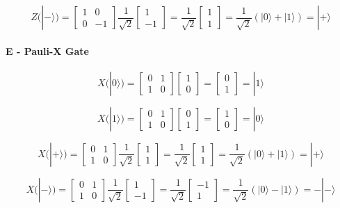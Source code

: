 \documentclass[12pt]{article}
\begin{document}
$$ Z(|-⟩) = \begin{bmatrix} 1 & 0 \\ 0 & -1 \end{bmatrix} \frac{1}{\sqrt{2}} \begin{bmatrix} 1 \\ -1 \end{bmatrix} = \frac{1}{\sqrt{2}} \begin{bmatrix} 1 \\ 1 \end{bmatrix} = \frac{1}{\sqrt{2}} (|0⟩ + |1⟩) = |+⟩ $$

\paragraph*{E - Pauli-X Gate}

$$ X(|0⟩) = \begin{bmatrix} 0 & 1 \\ 1 & 0 \end{bmatrix} \begin{bmatrix} 1 \\ 0 \end{bmatrix} = \begin{bmatrix} 0 \\ 1 \end{bmatrix} = |1⟩ $$

$$ X(|1⟩) = \begin{bmatrix} 0 & 1 \\ 1 & 0 \end{bmatrix} \begin{bmatrix} 0 \\ 1 \end{bmatrix} = \begin{bmatrix} 1 \\ 0 \end{bmatrix} = |0⟩ $$

$$ X(|+⟩) = \begin{bmatrix} 0 & 1 \\ 1 & 0 \end{bmatrix} \frac{1}{\sqrt{2}} \begin{bmatrix} 1 \\ 1 \end{bmatrix} = \frac{1}{\sqrt{2}} \begin{bmatrix} 1 \\ 1 \end{bmatrix} = \frac{1}{\sqrt{2}} (|0⟩ + |1⟩) = |+⟩ $$

$$ X(|-⟩) = \begin{bmatrix} 0 & 1 \\ 1 & 0 \end{bmatrix} \frac{1}{\sqrt{2}} \begin{bmatrix} 1 \\ -1 \end{bmatrix} = \frac{1}{\sqrt{2}} \begin{bmatrix} -1 \\ 1 \end{bmatrix} = \frac{1}{\sqrt{2}} (|0⟩ - |1⟩) = -|-⟩ $$
\end{document}
